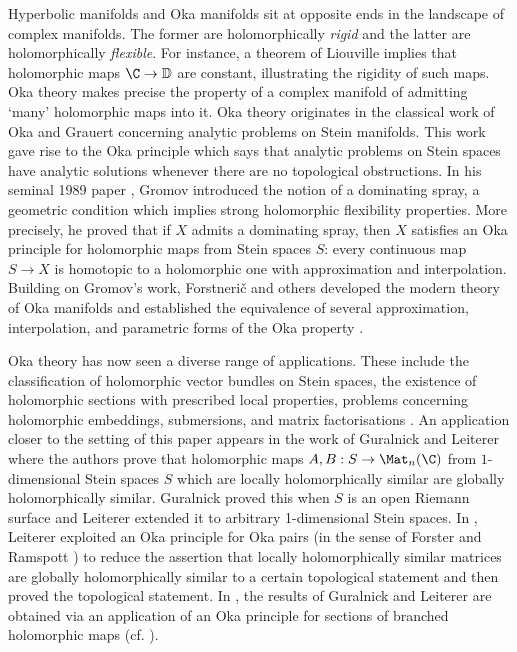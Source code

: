 \documentclass[12pt, a4paper, oneside]{amsart}
\theoremstyle{plain} %
\theoremstyle{definition} %
\theoremstyle{remark} %
\begin{document}
Hyperbolic manifolds and Oka manifolds sit at opposite ends in the landscape of complex manifolds. The former are holomorphically \emph{rigid} and the latter are holomorphically \emph{flexible}. For instance, a theorem of Liouville implies that holomorphic maps $\C\to \mathbb D$ are constant, illustrating the rigidity of such maps. Oka theory makes precise the property of a complex manifold of admitting `many' holomorphic maps into it. Oka theory originates in the classical work of Oka and Grauert concerning analytic problems on Stein manifolds. This work gave rise to the Oka principle which says that analytic problems on Stein spaces have analytic solutions whenever there are no topological obstructions. In his seminal 1989 paper \cite{Gro89}, Gromov introduced the notion of a dominating spray, a geometric condition which implies strong holomorphic flexibility properties. More precisely, he proved that if $X$ admits a dominating spray, then $X$ satisfies an Oka principle for holomorphic maps from Stein spaces $S$: every continuous map $S\to X$ is homotopic to a holomorphic one with approximation and interpolation.  Building on Gromov's work, Forstneri\v c and others developed the modern theory of Oka manifolds and established the equivalence of several approximation, interpolation, and parametric forms of the Oka property \cite{For06,For17}.

Oka theory has now seen a diverse range of applications. These include the classification of holomorphic vector bundles on Stein spaces, the existence of holomorphic sections with prescribed local properties, problems concerning holomorphic embeddings, submersions, and matrix factorisations \cite{For18, IK12}. An application closer to the setting of this paper appears in the work of Guralnick \cite{Gur88} and Leiterer \cite{Lei19} where the authors prove that holomorphic maps $A,B:S\to \Mat_n(\C)$ from $1$-dimensional Stein spaces $S$ which are locally holomorphically similar are globally holomorphically similar. Guralnick proved this when $S$ is an open Riemann surface and Leiterer extended it to arbitrary 1-dimensional Stein spaces. In \cite{Lei19}, Leiterer exploited an Oka principle for Oka pairs (in the sense of Forster and Ramspott \cite{FR66}) to reduce the assertion that locally holomorphically similar matrices are globally holomorphically similar to a certain topological statement and then proved the topological statement. In \cite[Theorem 6.14.9]{For17}, the results of Guralnick and Leiterer are obtained via an application of an Oka principle for sections of branched holomorphic maps (cf. \cite[Theorem 6.14.6]{For17}).  
\end{document}
